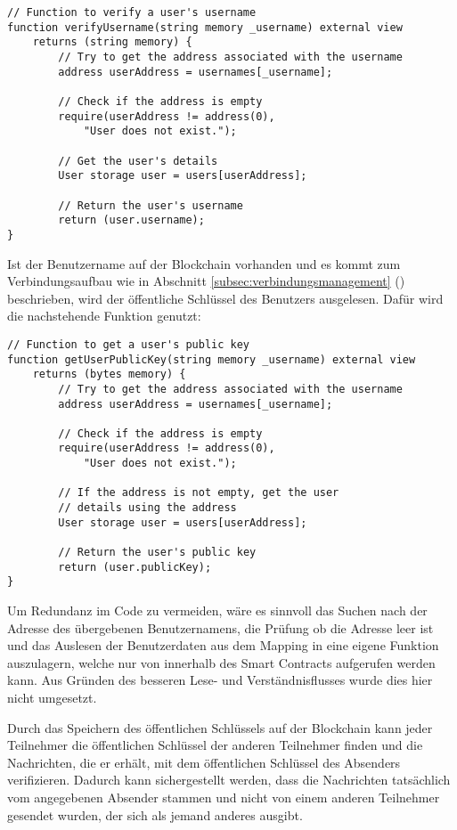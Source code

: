 \begin{lstlisting}[language=Solidity, caption={Suche nach einem Benutzernamen auf der Blockchain},captionpos=b]
// Function to verify a user's username
function verifyUsername(string memory _username) external view 
    returns (string memory) {
        // Try to get the address associated with the username
        address userAddress = usernames[_username];

        // Check if the address is empty
        require(userAddress != address(0), 
            "User does not exist.");

        // Get the user's details
        User storage user = users[userAddress];

        // Return the user's username
        return (user.username);
}
\end{lstlisting}


\noindent Ist der Benutzername auf der Blockchain vorhanden und es kommt zum Verbindungsaufbau wie in Abschnitt \ref{subsec:verbindungsmanagement} () beschrieben, wird der öffentliche Schlüssel des Benutzers ausgelesen. Dafür wird die nachstehende Funktion genutzt:

\begin{lstlisting}[language=Solidity, caption={Suche nach einem öffentlichen Schlüssel auf der Blockchain},captionpos=b]
// Function to get a user's public key
function getUserPublicKey(string memory _username) external view 
    returns (bytes memory) {
        // Try to get the address associated with the username
        address userAddress = usernames[_username];

        // Check if the address is empty
        require(userAddress != address(0), 
            "User does not exist.");

        // If the address is not empty, get the user 
        // details using the address
        User storage user = users[userAddress];

        // Return the user's public key
        return (user.publicKey);
}
\end{lstlisting}

\noindent Um Redundanz im Code zu vermeiden, wäre es sinnvoll das Suchen nach der Adresse des übergebenen Benutzernamens, die Prüfung ob die Adresse leer ist und das Auslesen der Benutzerdaten aus dem Mapping in eine eigene Funktion auszulagern, welche nur von innerhalb des Smart Contracts aufgerufen werden kann. Aus Gründen des besseren Lese- und Verständnisflusses wurde dies hier nicht umgesetzt.

Durch das Speichern des öffentlichen Schlüssels auf der Blockchain kann jeder Teilnehmer die öffentlichen Schlüssel der anderen Teilnehmer finden und die Nachrichten, die er erhält, mit dem öffentlichen Schlüssel des Absenders verifizieren. Dadurch kann sichergestellt werden, dass die Nachrichten tatsächlich vom angegebenen Absender stammen und nicht von einem anderen Teilnehmer gesendet wurden, der sich als jemand anderes ausgibt.


